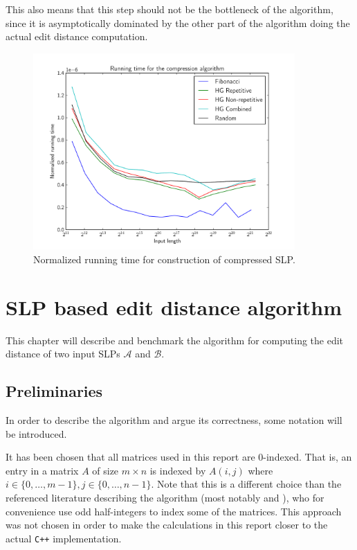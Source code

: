 \documentclass[twoside,11pt,openright]{report}
\newcommand{\SLP}[1] {\mathcal{#1}}
\begin{document}
This also means that this step should not be the bottleneck of the algorithm, since it is asymptotically dominated by the other part of the algorithm doing the actual edit distance computation.
%
\begin{figure}[h!]
  \centering
  \includegraphics[width=10cm]{compression/runningtime}
  \caption{Normalized running time for construction of compressed SLP.}
  \label{fig:compression:runningtime}
\end{figure}

\chapter{SLP based edit distance algorithm}
\label{ch:algorithm}

This chapter will describe and benchmark the algorithm for computing the edit distance of two input SLPs $\SLP{A}$ and $\SLP{B}$.

\section{Preliminaries}
\label{sec:algorithm:preliminaries}
In order to describe the algorithm and argue its correctness, some notation will be introduced.

It has been chosen that all matrices used in this report are $0$-indexed. That is, an entry in a matrix $A$ of size $m \times n$ is indexed by $A(i, j)$ where $i \in \{0, \dots, m - 1\}, j \in \{0, \dots, n - 1\}$. Note that this is a different choice than the referenced literature describing the algorithm (most notably \cite{Tiskin:2010:FDM:1873601.1873704} and \cite{DBLP:journals/corr/abs-0707-3619}), who for convenience use odd half-integers to index some of the matrices. This approach was not chosen in order to make the calculations in this report closer to the actual \texttt{C++} implementation.
\end{document}
